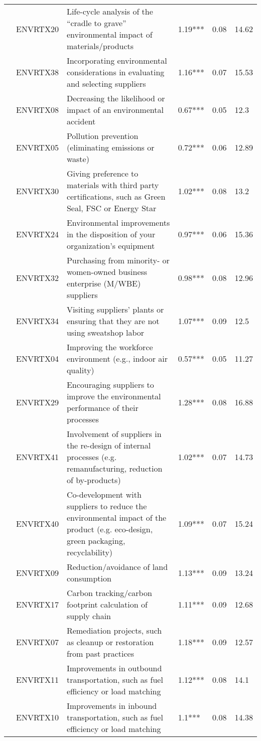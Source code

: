 \begin{landscape}
\begin{longtable}{l@{\hspace{6pt}}l@{\hspace{6pt}}p{12cm}@{\hspace{6pt}}l@{\hspace{6pt}}l@{\hspace{6pt}}l}
 & ENVRTX20 & Life-cycle analysis of the “cradle to grave” environmental impact of materials/products & 1.19*** & 0.08 & 14.62 \\
 & ENVRTX38 & Incorporating environmental considerations in evaluating and selecting suppliers & 1.16*** & 0.07 & 15.53 \\
 & ENVRTX08 & Decreasing the likelihood or impact of an environmental accident & 0.67*** & 0.05 & 12.3 \\
 & ENVRTX05 & Pollution prevention (eliminating emissions or waste) & 0.72*** & 0.06 & 12.89 \\
 & ENVRTX30 & Giving preference to materials with third party certifications, such as Green Seal, FSC or Energy Star & 1.02*** & 0.08 & 13.2 \\
 & ENVRTX24 & Environmental improvements in the disposition of your organization’s equipment & 0.97*** & 0.06 & 15.36 \\
 & ENVRTX32 & Purchasing from minority- or women-owned business enterprise (M/WBE) suppliers & 0.98*** & 0.08 & 12.96 \\
 & ENVRTX34 & Visiting suppliers’ plants or ensuring that they are not using sweatshop labor & 1.07*** & 0.09 & 12.5 \\
 & ENVRTX04 & Improving the workforce environment (e.g., indoor air quality) & 0.57*** & 0.05 & 11.27 \\
 & ENVRTX29 & Encouraging suppliers to improve the environmental performance of their processes & 1.28*** & 0.08 & 16.88 \\
 & ENVRTX41 & Involvement of suppliers in the re-design of internal processes (e.g. remanufacturing, reduction of by-products) & 1.02*** & 0.07 & 14.73 \\
 & ENVRTX40 & Co-development with suppliers to reduce the environmental impact of the product (e.g. eco-design, green packaging, recyclability) & 1.09*** & 0.07 & 15.24 \\
 & ENVRTX09 & Reduction/avoidance of land consumption & 1.13*** & 0.09 & 13.24 \\
 & ENVRTX17 & Carbon tracking/carbon footprint calculation of supply chain & 1.11*** & 0.09 & 12.68 \\
 & ENVRTX07 & Remediation projects, such as cleanup or restoration from past practices & 1.18*** & 0.09 & 12.57 \\
 & ENVRTX11 & Improvements in outbound transportation, such as fuel efficiency or load matching & 1.12*** & 0.08 & 14.1 \\
 & ENVRTX10 & Improvements in inbound transportation, such as fuel efficiency or load matching & 1.1*** & 0.08 & 14.38 \\

\end{longtable}
\end{landscape}
